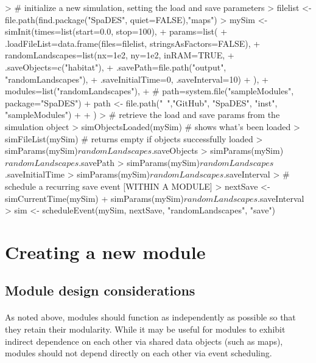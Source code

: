 \documentclass{article}
\begin{document}
\begin{Schunk}
\begin{Sinput}
> # initialize a new simulation, setting the load and save parameters
> filelist <- file.path(find.package("SpaDES", quiet=FALSE),"maps")
> mySim <- simInit(times=list(start=0.0, stop=100),
+                  params=list(
+                    .loadFileList=data.frame(files=filelist, stringsAsFactors=FALSE),
+                    randomLandscapes=list(nx=1e2, ny=1e2, inRAM=TRUE,
+                                 .saveObjects=c("habitat"),
+                                 .savePath=file.path("output", "randomLandscapes"),
+                                 .saveInitialTime=0, .saveInterval=10)
+                    ),
+                  modules=list("randomLandscapes"),
+                  # path=system.file("sampleModules", package="SpaDES")
+                  path <- file.path("~","GitHub", "SpaDES", "inst", "sampleModules")
+ 
+ )
> # retrieve the load and save params from the simulation object
> simObjectsLoaded(mySim) # shows what's been loaded
> simFileList(mySim) # returns empty if objects successfully loaded
> simParams(mySim)$randomLandscapes$.saveObjects
> simParams(mySim)$randomLandscapes$.savePath
> simParams(mySim)$randomLandscapes$.saveInitialTime
> simParams(mySim)$randomLandscapes$.saveInterval
> # schedule a recurring save event [WITHIN A MODULE]
> nextSave <- simCurrentTime(mySim) + simParams(mySim)$randomLandscapes$.saveInterval
> sim <- scheduleEvent(mySim, nextSave, "randomLandscapes", "save")
\end{Sinput}
\end{Schunk}

\newpage

\section{Creating a new module}

\subsection{Module design considerations}

\paragraph{}
\textit{\color{blue}{perhaps a bit about design phlosophy, relating back to dependencies and how to carefully build modules that actually retain modularity.}}

\paragraph{}
As noted above, modules should function as independently as possible so that they retain their modularity. While it may be useful for modules to exhibit indirect dependence on each other via shared data objects (such as maps), modules should not depend directly on each other via event scheduling.
\end{document}
